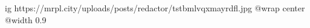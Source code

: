  
 
 
 
 

\ifcmt
  ig https://mrpl.city/uploads/posts/redactor/tstbmlvqxmayrdfl.jpg
  @wrap center
  @width 0.9
\fi
